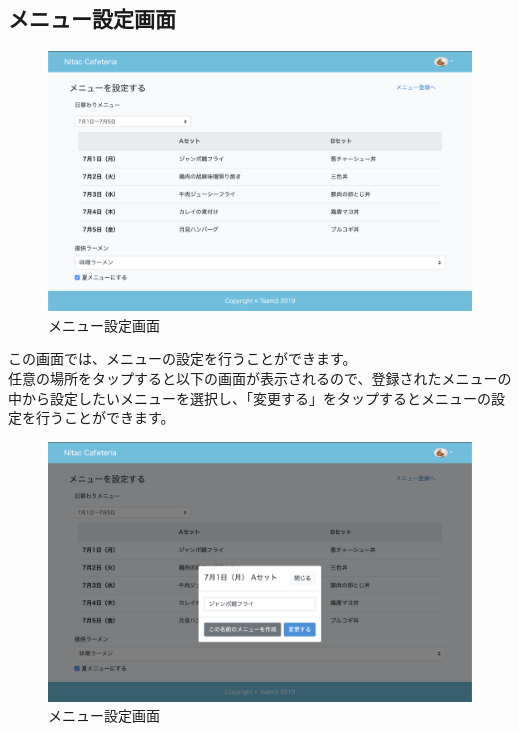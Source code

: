 \documentclass[a4paper]{jsarticle}
\begin{document}
\subsection{メニュー設定画面}
\begin{figure}[htbp]
\centering
	\caption{メニュー設定画面}
	\includegraphics[scale = 0.225]{image/set_menu.png}
\end{figure}
この画面では、メニューの設定を行うことができます。\\
任意の場所をタップすると以下の画面が表示されるので、登録されたメニューの中から設定したいメニューを選択し、「変更する」をタップするとメニューの設定を行うことができます。
\begin{figure}[htbp]
\centering
	\caption{メニュー設定画面}
	\includegraphics[scale = 0.225]{image/set_menu2.png}
\end{figure}
\newpage
\end{document}
